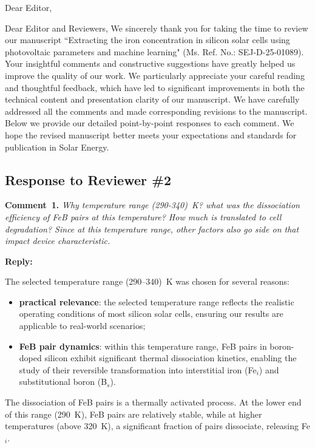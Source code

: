 \documentclass[a4paper,fleqn]{cas-sc}
\begin{document}
\shorttitle{}


Dear Editor,

Dear Editor and Reviewers,
We sincerely thank you for taking the time to review our manuscript “Extracting the iron concentration in silicon solar cells using photovoltaic parameters and machine learning" (Ms. Ref. No.: SEJ-D-25-01089). 
Your insightful comments and constructive suggestions have greatly helped us improve the quality of our work. We particularly appreciate your careful reading and thoughtful feedback, which have led to significant improvements in both the technical content and presentation clarity of our manuscript. We have carefully addressed all the comments and made corresponding revisions to the manuscript. 
Below we provide our detailed point-by-point responses to each comment. We hope the revised manuscript better meets your expectations and standards for publication in Solar Energy.


\vspace{1cm}
\subsection*{Response to Reviewer \#2 }

\noindent
\textcolor[rgb]{0.00,0.50,1.00}{\textbf{Comment~1.}}
\emph{Why temperature range (290-340)~K? what was the dissociation efficiency of FeB pairs at this temperature? How much is translated to cell degradation? Since at this temperature range, other factors also go side on that impact device characteristic.}


\noindent
\textcolor[rgb]{0.51,0.00,0.00}{\textbf{Reply:}}

The selected temperature range (290–340)~K was chosen for several reasons:
\begin{itemize}
    \item \textbf{practical relevance}: the selected temperature range reflects the realistic operating conditions of most silicon solar cells, ensuring our results are applicable to real-world scenarios;
    \item \textbf{FeB pair dynamics}: within this temperature range, FeB pairs in boron-doped silicon exhibit significant thermal dissociation kinetics, enabling the study of their reversible transformation into interstitial iron (Fe$_i$) and substitutional boron (B$_s$).
\end{itemize}

The dissociation of FeB pairs is a thermally activated process. 
At the lower end of this range (290~K), FeB pairs are relatively stable, while at higher temperatures (above 320~K), a significant fraction of pairs dissociate, releasing Fe$_i$.
\cite{istratov1999}
\end{document}
